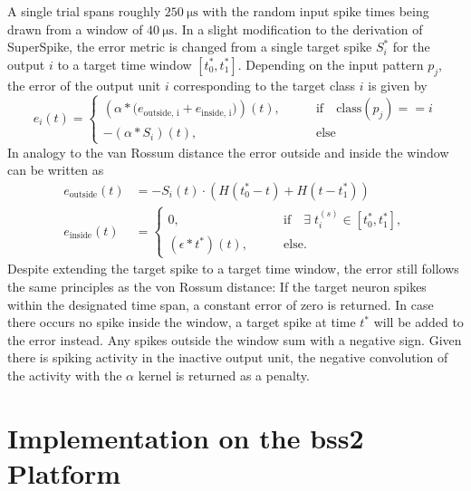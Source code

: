 A single trial spans roughly $\SI{250}{\micro \s}$ with the random input spike times being drawn from a window of $\SI{40}{\micro \s}$. In a slight modification to the derivation of SuperSpike, the error metric is changed from a single target spike $S_i^*$ for the output $i$ to a target time window $[t^*_0, t^*_1]$. Depending on the input pattern $p_j$, the error of the output unit $i$ corresponding to the target class $i$ is given by
\begin{equation}
e_i(t) = \begin{cases}
\left(\alpha \ast \big(e_\text{outside, i} + e_\text{inside, i}\big)\right)(t),& \quad \quad \text{if} \quad \text{class}(p_j) == i \\
- (\alpha \ast S_i)(t)	,& \quad \quad \text{else} 
\end{cases}
\label{superspikeerror}
\end{equation}
In analogy to the van Rossum distance the error outside and inside the window can be written as 
\begin{align*}
e_\text{outside}(t) &= - S_i(t) \cdot \left(H(t^*_0 - t) + H(t - t^*_1)\right) \\
e_\text{inside}(t) &= 
\begin{cases}
0 ,&\quad \quad \text{if} \quad \exists \; t^{(s)}_i \in [t^*_0, t^*_1], \\
(\epsilon \ast t^*)(t) ,& \quad \quad \text{else}.
\end{cases}
\end{align*}
Despite extending the target spike to a target time window, the error still follows the same principles as the von Rossum distance: If the target neuron spikes within the designated time span, a constant error of zero is returned. In case there occurs no spike inside the window, a target spike at time $t^*$ will be added to the error instead. Any spikes outside the window sum with a negative sign. Given there is spiking activity in the inactive output unit, the negative convolution of the activity with the $\alpha$ kernel is returned as a penalty.

\section{Implementation on the \acrshort{bss2} Platform}

